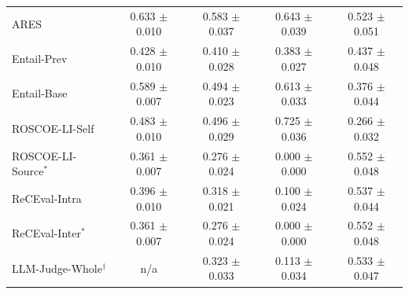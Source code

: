 \begin{table}[t]
{\begin{tabular}{lcccc}
ARES
    & 0.633 $\pm$ 0.010 & 0.583 $\pm$ 0.037 & 0.643 $\pm$ 0.039 & 0.523 $\pm$ 0.051 \\
Entail-Prev
    & 0.428 $\pm$ 0.010 & 0.410 $\pm$ 0.028 & 0.383 $\pm$ 0.027 & 0.437 $\pm$ 0.048 \\
Entail-Base
    & 0.589 $\pm$ 0.007 & 0.494 $\pm$ 0.023 & 0.613 $\pm$ 0.033 & 0.376 $\pm$ 0.044 \\
ROSCOE-LI-Self
    & 0.483 $\pm$ 0.010 & 0.496 $\pm$ 0.029 & 0.725 $\pm$ 0.036 & 0.266 $\pm$ 0.032 \\
ROSCOE-LI-Source$^\ast$
    & 0.361 $\pm$ 0.007 & 0.276 $\pm$ 0.024 & 0.000 $\pm$ 0.000 & 0.552 $\pm$ 0.048 \\
ReCEval-Intra
    & 0.396 $\pm$ 0.010 & 0.318 $\pm$ 0.021 & 0.100 $\pm$ 0.024 & 0.537 $\pm$ 0.044 \\
ReCEval-Inter$^\ast$
    & 0.361 $\pm$ 0.007 & 0.276 $\pm$ 0.024 & 0.000 $\pm$ 0.000 & 0.552 $\pm$ 0.048 \\
LLM-Judge-Whole$^\dagger$
    & n/a & 0.323 $\pm$ 0.033 & 0.113 $\pm$ 0.034 & 0.533 $\pm$ 0.047 \\

\bottomrule
\end{tabular}
}
\end{table}
